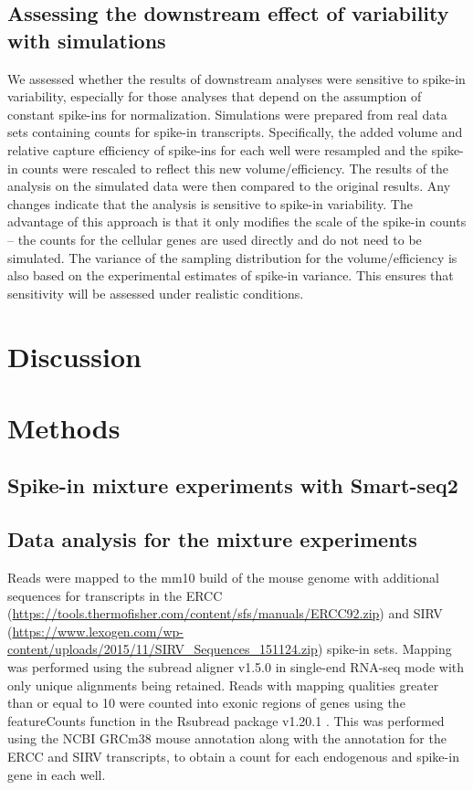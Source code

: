 \documentclass{article}
\begin{document}
\subsection{Assessing the downstream effect of variability with simulations}
We assessed whether the results of downstream analyses were sensitive to spike-in variability, especially for those analyses that depend on the assumption of constant spike-ins for normalization.
Simulations were prepared from real data sets containing counts for spike-in transcripts.
Specifically, the added volume and relative capture efficiency of spike-ins for each well were resampled and the spike-in counts were rescaled to reflect this new volume/efficiency.
The results of the analysis on the simulated data were then compared to the original results.
Any changes indicate that the analysis is sensitive to spike-in variability.
The advantage of this approach is that it only modifies the scale of the spike-in counts -- the counts for the cellular genes are used directly and do not need to be simulated.
The variance of the sampling distribution for the volume/efficiency is also based on the experimental estimates of spike-in variance.
This ensures that sensitivity will be assessed under realistic conditions. 

\section{Discussion}

\section{Methods}

\subsection{Spike-in mixture experiments with Smart-seq2}

\subsection{Data analysis for the mixture experiments}
Reads were mapped to the mm10 build of the mouse genome with additional sequences for transcripts in the ERCC (\url{https://tools.thermofisher.com/content/sfs/manuals/ERCC92.zip}) and SIRV (\url{https://www.lexogen.com/wp-content/uploads/2015/11/SIRV_Sequences_151124.zip}) spike-in sets.
Mapping was performed using the subread aligner v1.5.0 \cite{liao2013subread} in single-end RNA-seq mode with only unique alignments being retained.
Reads with mapping qualities greater than or equal to 10 were counted into exonic regions of genes using the featureCounts function in the Rsubread package v1.20.1 \cite{liao2014featurecounts}.
This was performed using the NCBI GRCm38 mouse annotation along with the annotation for the ERCC and SIRV transcripts, to obtain a count for each endogenous and spike-in gene in each well.
\end{document}
